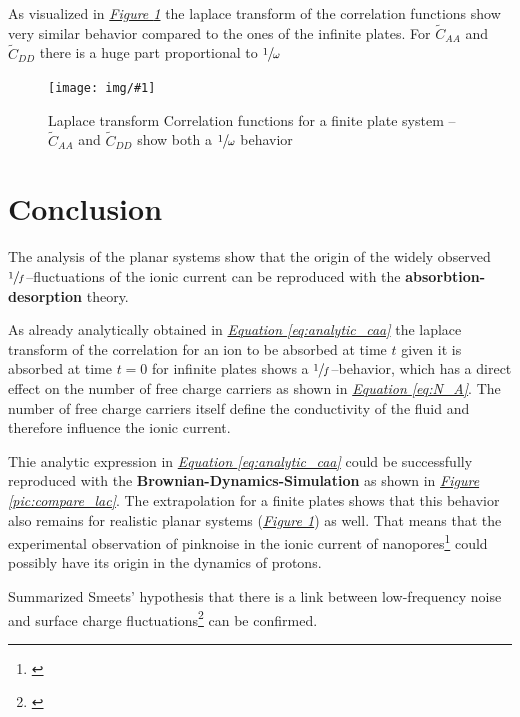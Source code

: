 \documentclass[a4paper, parskip=half]{scrartcl}
\newcommand{\effect}[1]{%
	\textbf{#1}%
}
\newcommand{\myImage}[2]{
	\begin{figure}[H]
	\centering
	\texttt{[image: img/\#1]}
	\caption{#2}
	\label{pic:#1}
	\end{figure}
}
\newcommand{\myFigRef}[1]{\textit{\hyperref[#1]{Figure \ref*{#1}}}}
\newcommand{\myEqRef}[1]{\textit{\hyperref[eq:#1]{Equation \ref*{eq:#1}}}}
\newcommand{\myCite}[1]{\footnote{\cite{#1} \citeauthor{#1} \citetitle{#1} \citeyear{#1}}}
\begin{document}
As visualized in \myFigRef{pic:limited_correlation_laplace} the laplace transform of the correlation functions show very similar behavior compared to the ones of the infinite plates. For $\widetilde{C}_{AA}$ and $\widetilde{C}_{DD}$ there is a huge part proportional to $\sfrac{1}{\omega}$

\myImage{limited_correlation_laplace}{Laplace transform Correlation functions for a finite plate system -- $\widetilde{C}_{AA}$ and $\widetilde{C}_{DD}$ show both a $\sfrac{1}{\omega}$ behavior}



\newpage
\section{Conclusion}

The analysis of the planar systems show that the origin of the widely observed $\sfrac{1}{f}$--fluctuations of the ionic current can be reproduced with the \effect{absorbtion-desorption} theory.

As already analytically obtained in \myEqRef{analytic_caa} the laplace transform of the correlation for an ion to be absorbed at time $t$ given it is absorbed at time $t=0$ for infinite plates shows a $\sfrac{1}{f}$--behavior, which has a direct effect on the number of free charge carriers as shown in \myEqRef{N_A}. The number of free charge carriers itself define the conductivity of the fluid and therefore influence the ionic current.

Thie analytic expression in \myEqRef{analytic_caa} could be successfully reproduced with the \effect{Brownian-Dynamics-Simulation} as shown in \myFigRef{pic:compare_lac}. The extrapolation for a finite plates shows that this behavior also remains for realistic planar systems (\myFigRef{pic:limited_correlation_laplace}) as well. That means that the experimental observation of pinknoise in the ionic current of nanopores\myCite{pinknoise} could possibly have its origin in the dynamics of protons.

Summarized Smeets' hypothesis that there is a link between low-frequency noise and surface charge fluctuations\myCite{paper0} can be confirmed.

\newpage
\end{document}

